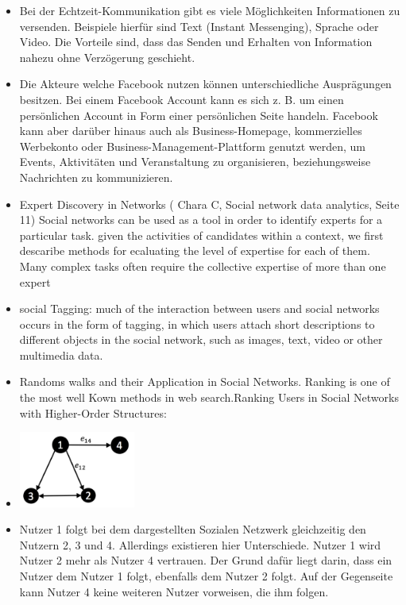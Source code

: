 \begin{itemize}
\item Bei der Echtzeit-Kommunikation gibt es viele Möglichkeiten Informationen zu versenden. Beispiele hierfür sind Text (Instant Messenging), Sprache oder Video. Die Vorteile sind, dass das Senden und Erhalten von Information nahezu ohne Verzögerung geschieht.
\item Die Akteure welche Facebook nutzen können unterschiedliche Ausprägungen besitzen. Bei einem Facebook Account kann es sich z. B. um einen persönlichen Account in Form einer persönlichen Seite handeln. Facebook kann aber darüber hinaus auch als Business-Homepage, kommerzielles Werbekonto oder Business-Management-Plattform genutzt werden, um Events, Aktivitäten und Veranstaltung zu organisieren, beziehungsweise Nachrichten zu kommunizieren.
\item Expert Discovery in Networks ( Chara C, Social network data analytics, Seite 11) \glqq Social networks can be used as a tool in order to identify experts for a particular task. given the activities of candidates within a context, we first descaribe methods for ecaluating the level of expertise for each of them. Many complex tasks often require the collective expertise of more than one expert\grqq
\item \glqq social Tagging:  much of the interaction between users and social networks occurs in the form of tagging, in which users attach short descriptions to different objects in the social network, such as images, text, video or other multimedia data.\grqq
\item Randoms walks and their Application in Social Networks. Ranking is one of the most well Kown methods in web search.Ranking Users in Social Networks with Higher-Order Structures:
\item \includegraphics[width=0.3\textwidth]{bilder/social-network-users.png}
\item Nutzer 1 folgt bei dem dargestellten Sozialen Netzwerk  gleichzeitig den Nutzern 2, 3 und 4. Allerdings existieren hier Unterschiede. Nutzer 1 wird Nutzer 2 mehr als Nutzer 4 vertrauen. Der Grund dafür liegt darin, dass ein Nutzer dem Nutzer 1 folgt, ebenfalls dem Nutzer 2 folgt. Auf der Gegenseite kann Nutzer 4 keine weiteren Nutzer vorweisen, die ihm folgen.

\end{itemize}
